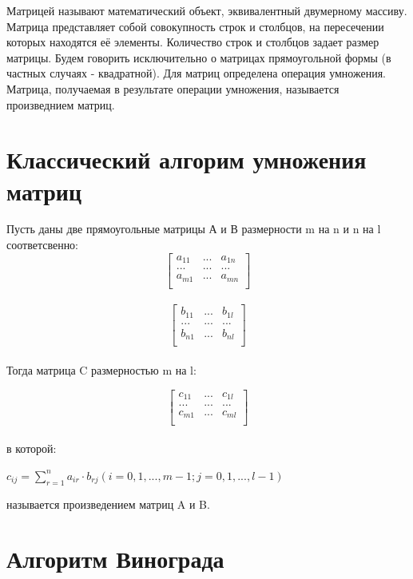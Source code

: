 \documentclass[a4paper,14pt]{report}
\begin{document}
Матрицей называют математический объект, эквивалентный двумерному массиву. Матрица представляет собой совокупность строк и столбцов, на пересечении которых находятся её элементы. Количество строк и столбцов задает размер матрицы. Будем говорить исключительно о матрицах прямоугольной формы (в частных случаях - квадратной). Для матриц определена операция умножения. Матрица, получаемая в результате операции умножения, называется произведнием матриц.

\section*{Классический алгорим умножения матриц}

Пусть даны две прямоугольные матрицы А и В размерности m на n и n на l соответсвенно:
\[ \begin{bmatrix}
a_{11} & ... & a_{1n} \\
... & ... & ... \\
a_{m1} & ... & a_{mn} \\
\end{bmatrix} \]\\

\[ \begin{bmatrix}
b_{11} & ... & b_{1l} \\
... & ... & ... \\
b_{n1} & ... & b_{nl} \\
\end{bmatrix} \]\\

Тогда матрица C размерностью m на l:

\[ \begin{bmatrix}
c_{11} & ... & c_{1l} \\
... & ... & ... \\
c_{m1} & ... & c_{ml} \\
\end{bmatrix} \]\\

в которой:

$c_{ij} = \sum\limits_{r=1}^n a_{ir}\cdot b_{rj}  (i = 0, 1, ..., m - 1; j = 0, 1, ..., l - 1)$

называется произведением матриц A и B.

\section*{Алгоритм Винограда}
\end{document}
